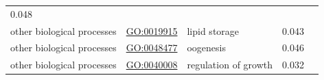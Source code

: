\documentclass[
]{article}
\begin{document}
\begin{longtable}[]{@{}lllll@{}}
\begin{minipage}[t]{0.17\columnwidth}
0.048\strut
\end{minipage} & \begin{minipage}[t]{0.17\columnwidth}\raggedright
\strut
\end{minipage}\tabularnewline
\begin{minipage}[t]{0.17\columnwidth}\raggedright
other biological processes\strut
\end{minipage} & \begin{minipage}[t]{0.17\columnwidth}\raggedright
\url{GO:0019915}\strut
\end{minipage} & \begin{minipage}[t]{0.17\columnwidth}\raggedright
lipid storage\strut
\end{minipage} & \begin{minipage}[t]{0.17\columnwidth}\raggedright
0.043\strut
\end{minipage} & \begin{minipage}[t]{0.17\columnwidth}\raggedright
\strut
\end{minipage}\tabularnewline
\begin{minipage}[t]{0.17\columnwidth}\raggedright
other biological processes\strut
\end{minipage} & \begin{minipage}[t]{0.17\columnwidth}\raggedright
\url{GO:0048477}\strut
\end{minipage} & \begin{minipage}[t]{0.17\columnwidth}\raggedright
oogenesis\strut
\end{minipage} & \begin{minipage}[t]{0.17\columnwidth}\raggedright
0.046\strut
\end{minipage} & \begin{minipage}[t]{0.17\columnwidth}\raggedright
\strut
\end{minipage}\tabularnewline
\begin{minipage}[t]{0.17\columnwidth}\raggedright
other biological processes\strut
\end{minipage} & \begin{minipage}[t]{0.17\columnwidth}\raggedright
\url{GO:0040008}\strut
\end{minipage} & \begin{minipage}[t]{0.17\columnwidth}\raggedright
regulation of growth\strut
\end{minipage} & \begin{minipage}[t]{0.17\columnwidth}\raggedright
0.032\strut
\end{minipage} & \begin{minipage}[t]{0.17\columnwidth}\raggedright

\end{minipage}
\end{longtable}
\end{document}

